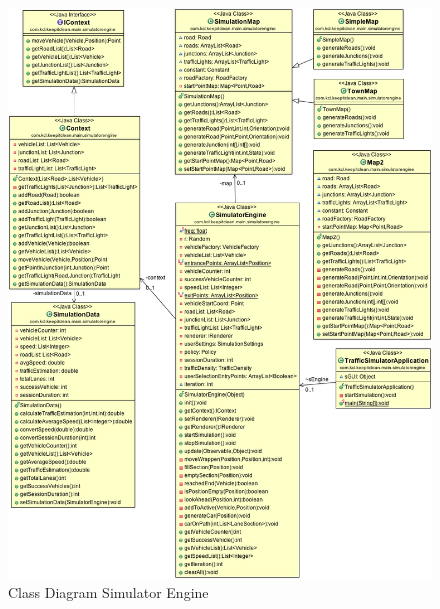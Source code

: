 \documentclass[11pt]{article}
\begin{document}
\begin{enumerate}
\begin{figure}[H]
        \includegraphics[width=14cm]{simulatorengine} 
        \centering
        \caption{Class Diagram Simulator Engine} 
        \label{cdsimulatorengine}
\end{figure}



\end{enumerate}
\end{document}
